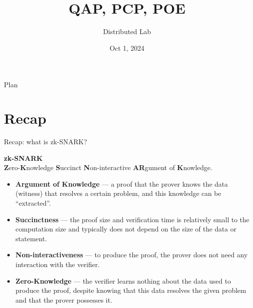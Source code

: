 \documentclass{zkdl-presentation-template}
\title[zk-SNARK I]{\textbf{QAP, PCP, POE}}
\author{Distributed Lab}
\date{Oct 1, 2024}
\begin{document}
    \frame {
        \titlepage
    }

    \begin{frame}{Plan}
        \tableofcontents
    \end{frame}

    \section{Recap}

    \begin{frame}{Recap: what is zk-SNARK?}
        \begin{definition}
            \begin{center}
                \textbf{zk-SNARK} \\
                \textbf{Z}ero-\textbf{K}nowledge \textbf{S}uccinct \textbf{N}on-interactive \textbf{AR}gument of \textbf{K}nowledge.
            \end{center}
        \end{definition}

        \pause

        \begin{itemize}[label=]
            \item \textbf{Argument of Knowledge} --- a proof that the prover knows the data (witness) that resolves a certain
            problem, and this knowledge can be ``extracted''. \pause
            \item \textbf{Succinctness} --- the proof size and verification time is relatively small to the computation size and typically does not depend on the size of 
            the data or statement. \pause
            \item \textbf{Non-interactiveness} --- to produce the proof, the prover does not need any interaction
            with the verifier. \pause
            \item \textbf{Zero-Knowledge} --- the verifier learns nothing about the data used to produce the
            proof, despite knowing that this data resolves the given problem and that the prover possesses it.
        \end{itemize}
    \end{frame}
\end{document}
